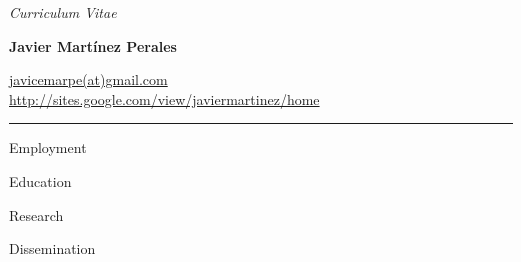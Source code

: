 \documentclass{style_classes/cv_new_academic}
\begin{document}
 
\begin{center}
            \textit{Curriculum Vitae}\\
            {\Large \textbf{Javier Mart\'inez Perales}\par}
            \href{javicemarpe@gmail.com}{javicemarpe(at)gmail.com}\\
            \href{http://sites.google.com/view/javiermartinez/home}{http://sites.google.com/view/javiermartinez/home}
        \end{center}
        \vspace{-0.15in}
        \rule{\textwidth}{1pt}
        \vspace{0.05in}

 
 


  
        \begin{Section}
            {Employment}
          \end{Section}

          
        

 



  \begin{Section}
    {Education}
  \end{Section}
 
  
 


 \newpage 

\begin{Section}
    {Research} 
  \end{Section}
 

 

 \begin{Section}
    {Dissemination} 
  \end{Section}
\end{document}
